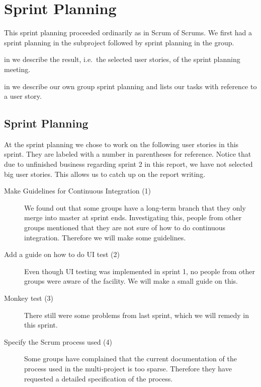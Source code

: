 \chapter{Sprint Planning}
This sprint planning proceeded ordinarily as in Scrum of Scrums. We first had a sprint planning in the subproject followed by sprint planning in the group.

\begin{chapterorganization}
  \item in  we describe the result, i.e.\ the selected user stories, of the \bd sprint planning meeting.
  \item in  we describe our own group sprint planning and lists our tasks with reference to a user story.
\end{chapterorganization}

\section{\bdtitle Sprint Planning}\label{sec:S3_bd}
At the \bd sprint planning we chose to work on the following user stories in this sprint. They are labeled with a number in parentheses for reference. Notice that due to unfinished business regarding sprint 2 in this report, we have not selected big user stories. This allows us to catch up on the report writing.

\begin{description}
  \item[Make Guidelines for Continuous Integration (1)] We found out that some groups have a long-term branch that they only merge into master at sprint ends. Investigating this, people from other groups mentioned that they are not sure of how to do continuous integration. Therefore we will make some guidelines.
  \item[Add a guide on how to do UI test (2)] Even though UI testing was implemented in sprint 1, no people from other groups were aware of the facility. We will make a small guide on this.
  \item[Monkey test (3)] There still were some problems from last sprint, which we will remedy in this sprint. 
  \item[Specify the Scrum process used (4)] Some groups have complained that the current documentation of the process used in the multi-project is too sparse. Therefore they have requested a detailed specification of the process.
\end{description}

